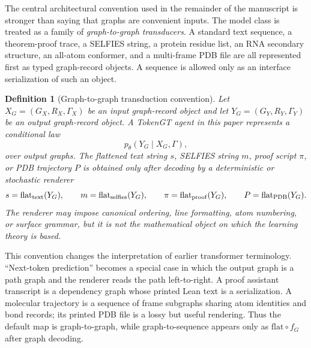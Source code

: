 \documentclass[11pt]{article}
\newtheorem{definition}{Definition}[section]
\newcommand{\1}{\mathbf{1}}
\begin{document}
The central architectural convention used in the remainder of the manuscript is stronger than saying that graphs are convenient inputs. The model class is treated as a family of \emph{graph-to-graph transducers}. A standard text sequence, a theorem-proof trace, a SELFIES string, a protein residue list, an RNA secondary structure, an all-atom conformer, and a multi-frame PDB file are all represented first as typed graph-record objects. A sequence is allowed only as an interface serialization of such an object.

\begin{definition}[Graph-to-graph transduction convention]
Let \(X_G=(G_X,R_X,\Gamma_X)\) be an input graph-record object and let \(Y_G=(G_Y,R_Y,\Gamma_Y)\) be an output graph-record object. A TokenGT agent in this paper represents a conditional law
\[
  p_\theta(Y_G\mid X_G,\Gamma),
\]
over output graphs. The flattened text string \(s\), SELFIES string \(m\), proof script \(\pi\), or PDB trajectory \(P\) is obtained only after decoding by a deterministic or stochastic renderer
\[
  s=\mathrm{flat}_{\rm text}(Y_G),\qquad
  m=\mathrm{flat}_{\rm selfies}(Y_G),\qquad
  \pi=\mathrm{flat}_{\rm proof}(Y_G),\qquad
  P=\mathrm{flat}_{\rm PDB}(Y_G).
\]
The renderer may impose canonical ordering, line formatting, atom numbering, or surface grammar, but it is not the mathematical object on which the learning theory is based.
\end{definition}

This convention changes the interpretation of earlier transformer terminology. ``Next-token prediction'' becomes a special case in which the output graph is a path graph and the renderer reads the path left-to-right. A proof assistant transcript is a dependency graph whose printed Lean text is a serialization. A molecular trajectory is a sequence of frame subgraphs sharing atom identities and bond records; its printed PDB file is a lossy but useful rendering. Thus the default map is graph-to-graph, while graph-to-sequence appears only as \(\mathrm{flat}\circ f_G\) after graph decoding.
\end{document}
